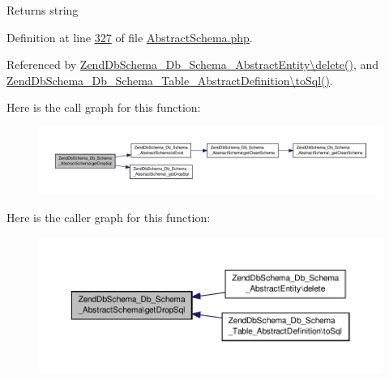 \begin{DoxyReturn}{Returns}
string 
\end{DoxyReturn}


Definition at line \hyperlink{AbstractSchema_8php_source_l00327}{327} of file \hyperlink{AbstractSchema_8php_source}{Abstract\-Schema.\-php}.



Referenced by \hyperlink{AbstractEntity_8php_source_l00192}{Zend\-Db\-Schema\-\_\-\-Db\-\_\-\-Schema\-\_\-\-Abstract\-Entity\textbackslash{}delete()}, and \hyperlink{AbstractDefinition_8php_source_l00128}{Zend\-Db\-Schema\-\_\-\-Db\-\_\-\-Schema\-\_\-\-Table\-\_\-\-Abstract\-Definition\textbackslash{}to\-Sql()}.



Here is the call graph for this function\-:\nopagebreak
\begin{figure}[H]
\begin{center}
\leavevmode
\includegraphics[width=350pt]{classZendDbSchema__Db__Schema__AbstractSchema_aec661ede88f500caaf2a09e98c31d3b0_cgraph}
\end{center}
\end{figure}




Here is the caller graph for this function\-:\nopagebreak
\begin{figure}[H]
\begin{center}
\leavevmode
\includegraphics[width=350pt]{classZendDbSchema__Db__Schema__AbstractSchema_aec661ede88f500caaf2a09e98c31d3b0_icgraph}
\end{center}
\end{figure}


